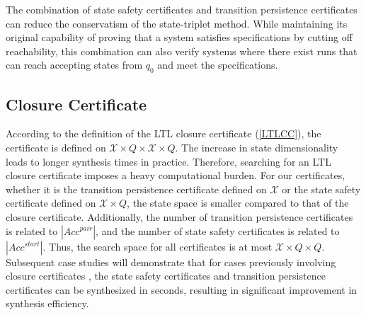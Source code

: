 
The combination of state safety certificates and transition persistence certificates can reduce the conservatism of the state-triplet method. While maintaining its original capability of proving that a system satisfies specifications by cutting off reachability, this combination can also verify systems where there exist runs that can reach accepting states from $q_0$ and meet the specifications.

\subsection{Closure Certificate}
According to the definition of the LTL closure certificate (\ref{LTLCC}), the certificate is defined on $\mathcal{X} \times Q \times \mathcal{X} \times Q$. The increase in state dimensionality leads to longer synthesis times in practice. Therefore, searching for an LTL closure certificate imposes a heavy computational burden. For our certificates, whether it is the transition persistence certificate defined on $\mathcal{X}$ or the state safety certificate defined on $\mathcal{X} \times Q$, the state space is smaller compared to that of the closure certificate. Additionally, the number of transition persistence certificates is related to $|Acc^{pair}|$, and the number of state safety certificates is related to $|Acc^{start}|$. Thus, the search space for all certificates is at most $\mathcal{X} \times Q \times Q$. Subsequent case studies will demonstrate that for cases previously involving closure certificates \cite{murali2024closure}, the state safety certificates and transition persistence certificates can be synthesized in seconds, resulting in significant improvement in synthesis efficiency.
